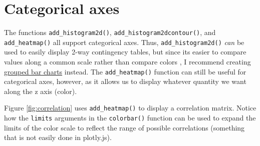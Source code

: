 \documentclass[
  12pt,
]{krantz}
\newenvironment{Shaded}{\begin{snugshade}}{\end{snugshade}}
\newcommand{\DataTypeTok}[1]{\textcolor[rgb]{0.13,0.29,0.53}{#1}}
\newcommand{\DecValTok}[1]{\textcolor[rgb]{0.00,0.00,0.81}{#1}}
\newcommand{\KeywordTok}[1]{\textcolor[rgb]{0.13,0.29,0.53}{\textbf{#1}}}
\newcommand{\NormalTok}[1]{#1}
\newcommand{\OperatorTok}[1]{\textcolor[rgb]{0.81,0.36,0.00}{\textbf{#1}}}
\newcommand{\StringTok}[1]{\textcolor[rgb]{0.31,0.60,0.02}{#1}}
\begin{document}
\hypertarget{categorical-axes}{%
\section{Categorical axes}\label{categorical-axes}}

The functions \texttt{add\_histogram2d()}, \texttt{add\_histogram2dcontour()}, and \texttt{add\_heatmap()} all support categorical axes. Thus, \texttt{add\_histogram2d()} \emph{can} be used to easily display 2-way contingency tables, but since its easier to compare values along a common scale rather than compare colors \citep{graphical-perception}, I recommend creating \protect\hyperlink{multiple-discrete-distributions}{grouped bar charts} instead. The \texttt{add\_heatmap()} function can still be useful for categorical axes, however, as it allows us to display whatever quantity we want along the z axis (color).


Figure \ref{fig:correlation} uses \texttt{add\_heatmap()} to display a correlation matrix. Notice how the \texttt{limits} arguments in the \texttt{colorbar()} function can be used to expand the limits of the color scale to reflect the range of possible correlations (something that is not easily done in plotly.js).

\begin{Shaded}
\end{Shaded}
\end{document}
